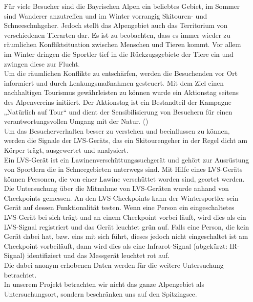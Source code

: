 \documentclass[12pt]{scrreprt}
\begin{document}
Für viele Besucher sind die Bayrischen Alpen ein beliebtes Gebiet, im Sommer sind Wanderer anzutreffen und im Winter vorrangig Skitouren- und Schneeschuhgeher. Jedoch stellt das Alpengebiet auch das Territorium von verschiedenen Tierarten dar. Es ist zu beobachten, dass es immer wieder zu räumlichen Konfliktsituation zwischen Menschen und Tieren kommt. Vor allem im Winter dringen die Sportler tief in die Rückzugsgebiete der Tiere ein und zwingen diese zur Flucht. \\
Um die räumlichen Konflikte zu entschärfen, werden die Besuchenden vor Ort informiert und durch Lenkungsmaßnahmen gesteuert. Mit dem Ziel einen nachhaltigen Tourismus gewährleisten zu können wurde ein Aktionstag seitens des Alpenvereins initiiert. Der Aktionstag ist ein Bestandteil der Kampagne „Natürlich auf Tour“ und dient der Sensibilisierung von Besuchern für einen verantwortungsvollen Umgang mit der Natur. 
(\cite{Alpenverein}) \\
Um das Besucherverhalten besser zu verstehen und beeinflussen zu können, werden die Signale der LVS-Geräts, das ein Skitourengeher in der Regel dicht am Körper trägt, ausgewertet und analysiert. \\
Ein LVS-Gerät ist ein Lawinenverschüttungssuchgerät und gehört zur Ausrüstung von Sportlern die in Schneegebieten unterwegs sind. Mit Hilfe eines LVS-Geräts können Personen, die von einer Lawine verschüttet worden sind, geortet werden. \\
Die Untersuchung über die Mitnahme von LVS-Geräten wurde anhand von Checkpoints gemessen. An den LVS-Checkpoints kann der Wintersportler sein Gerät auf dessen Funktionalität testen. Wenn eine Person ein eingeschaltetes LVS-Gerät bei sich trägt und an einem Checkpoint vorbei läuft, wird dies als ein LVS-Signal registriert und das Gerät leuchtet grün auf. Falls eine Person, die kein Gerät dabei hat, bzw. eins mit sich führt, dieses jedoch nicht eingeschaltet ist am Checkpoint vorbeiläuft, dann wird dies als eine Infrarot-Signal (abgekürzt: IR-Signal) identifiziert und das Messgerät leuchtet rot auf. \\
Die dabei anonym erhobenen Daten werden für die weitere Untersuchung betrachtet. \\
In unserem Projekt betrachten wir nicht das ganze Alpengebiet als Untersuchungsort, sondern beschränken uns auf den Spitzingsee. \\
\end{document}
